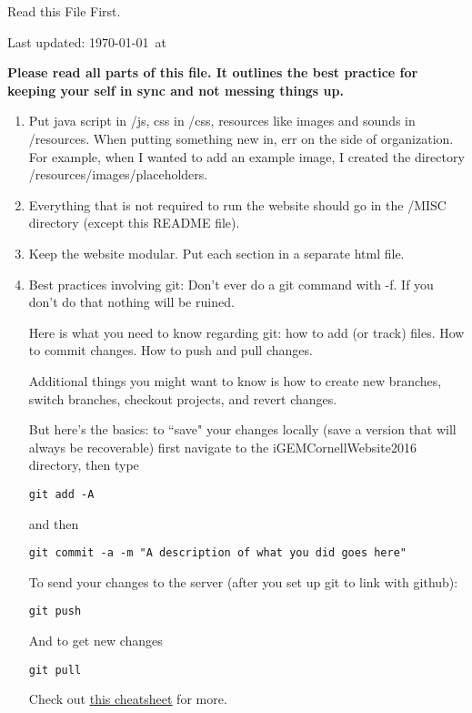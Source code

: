 \documentclass{sp2015course}
\begin{document}
	\begin{center}\Huge{Read this File First.}\end{center}
	\begin{small}
		Last updated: \today~at \currenttime
	\end{small}

	\textbf{Please read all parts of this file. It outlines the best practice for keeping your self in sync and not messing things up.}
	\begin{enumerate}
		\item Put java script in /js, css in /css, resources like images and sounds in /resources. When putting something new in, err on the side of organization. For example, when I wanted to add an example image, I created the directory /resources/images/placeholders.
		\item Everything that is not required to run the website should go in the /MISC directory (except this README file).
		\item Keep the website modular. Put each section in a separate html file.
		\item Best practices involving git: Don't ever do a git command with -f. If you don't do that nothing will be ruined.

		Here is what you need to know regarding git: how to add (or track) files. How to commit changes. How to push and pull changes.

		Additional things you might want to know is how to create new branches, switch branches, checkout projects, and revert changes.

		But here's the basics: to ``save" your changes locally (save a version that will always be recoverable) first navigate to the iGEMCornellWebsite2016 directory, then type
		\begin{lstlisting}[autogobble=true]
			git add -A
		\end{lstlisting}
		and then
		\begin{lstlisting}[autogobble=true]
			git commit -a -m "A description of what you did goes here"
		\end{lstlisting}
		To send your changes to the server (after you set up git to link with github):
		\begin{lstlisting}[autogobble=true]
			git push
		\end{lstlisting}
		And to get new changes
		\begin{lstlisting}[autogobble=true]
			git pull
		\end{lstlisting}
		Check out \href{https://training.github.com/kit/downloads/github-git-cheat-sheet.pdf}{\underline{this cheatsheet}} for more.
	\end{enumerate}
\end{document}
